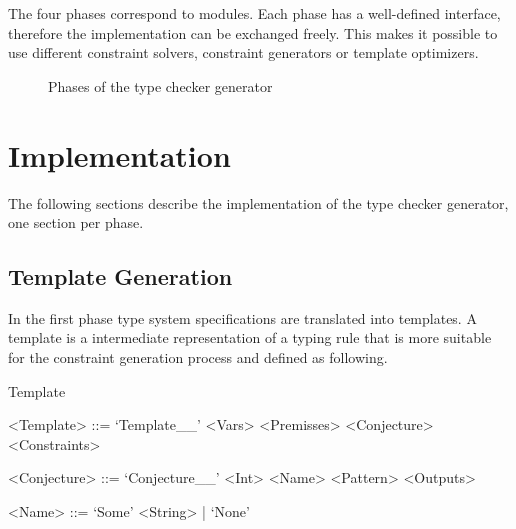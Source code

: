 The four phases correspond to modules. Each phase has a well-defined
interface, therefore the implementation can be exchanged freely. This
makes it possible to use different constraint solvers, constraint
generators or template optimizers.

\begin{figure}
\caption{Phases of the type checker generator}
\label{fig:phases}
\end{figure}
\section{Implementation}
\label{sec:implementation}
The following sections describe the implementation of the type checker
generator, one section per phase.

\subsection{Template Generation}
\label{sec:constraint-templates}
In the first phase type system specifications are translated into
templates. A template is a intermediate representation of a typing
rule that is more suitable for the constraint generation process and
defined as following.

\begin{definition}{Template}
  \begin{grammar}
    <Template> ::= `Template__' <Vars> <Premisses> <Conjecture> <Constraints>

    <Conjecture> ::= `Conjecture__' <Int> <Name> <Pattern> <Outputs>

    <Name> ::= `Some' <String> | `None'
  \end{grammar}
\end{definition}

